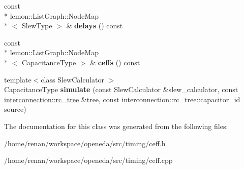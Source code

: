 \begin{DoxyCompactItemize}
\item 
\hypertarget{classophidian_1_1timing_1_1effective__capacitance__wire__model_a4376b848eaddca514112919fcb40b879}{const \\*
lemon\-::\-List\-Graph\-::\-Node\-Map\\*
$<$ Slew\-Type $>$ \& {\bfseries delays} () const }\label{classophidian_1_1timing_1_1effective__capacitance__wire__model_a4376b848eaddca514112919fcb40b879}

\item 
\hypertarget{classophidian_1_1timing_1_1effective__capacitance__wire__model_a7c5c700e08957253238cb8a1f9d55096}{const \\*
lemon\-::\-List\-Graph\-::\-Node\-Map\\*
$<$ Capacitance\-Type $>$ \& {\bfseries ceffs} () const }\label{classophidian_1_1timing_1_1effective__capacitance__wire__model_a7c5c700e08957253238cb8a1f9d55096}

\item 
\hypertarget{classophidian_1_1timing_1_1effective__capacitance__wire__model_a681989322ec4ca83203d766caaaf1c32}{{\footnotesize template$<$class Slew\-Calculator $>$ }\\Capacitance\-Type {\bfseries simulate} (const Slew\-Calculator \&slew\-\_\-calculator, const \hyperlink{classophidian_1_1interconnection_1_1rc__tree}{interconnection\-::rc\-\_\-tree} \&tree, const interconnection\-::rc\-\_\-tree\-::capacitor\-\_\-id source)}\label{classophidian_1_1timing_1_1effective__capacitance__wire__model_a681989322ec4ca83203d766caaaf1c32}

\end{DoxyCompactItemize}


The documentation for this class was generated from the following files\-:\begin{DoxyCompactItemize}
\item 
/home/renan/workspace/openeda/src/timing/ceff.\-h\item 
/home/renan/workspace/openeda/src/timing/ceff.\-cpp\end{DoxyCompactItemize}
